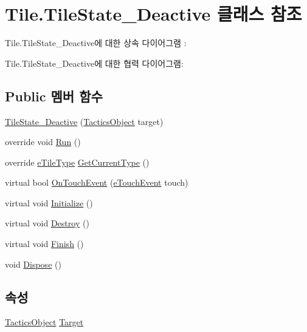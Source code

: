 \hypertarget{class_tile_1_1_tile_state___deactive}{}\section{Tile.\+Tile\+State\+\_\+\+Deactive 클래스 참조}
\label{class_tile_1_1_tile_state___deactive}


Tile.\+Tile\+State\+\_\+\+Deactive에 대한 상속 다이어그램 \+: 


Tile.\+Tile\+State\+\_\+\+Deactive에 대한 협력 다이어그램\+:
\subsection*{Public 멤버 함수}
\begin{DoxyCompactItemize}
\item 
\hyperlink{class_tile_1_1_tile_state___deactive_ac54bf790e9656300ad696f6d5bc3cb2b}{Tile\+State\+\_\+\+Deactive} (\hyperlink{class_tactics_object}{Tactics\+Object} target)
\item 
override void \hyperlink{class_tile_1_1_tile_state___deactive_a806c5dbc5eb43903ad41d448f3d25c61}{Run} ()
\item 
override \hyperlink{_tile_8cs_a271bc07be325bca511bcb747e0ff2fda}{e\+Tile\+Type} \hyperlink{class_tile_1_1_tile_state___deactive_a1aed8e0336e11dcb55cb598119c53eda}{Get\+Current\+Type} ()
\item 
virtual bool \hyperlink{class_tile_1_1_tile_state_a8687f7cb0e2c1a436c5ac395f4f6d07a}{On\+Touch\+Event} (\hyperlink{_touch_manager_8cs_ae33e321a424fe84ba8b2fdb81ad40a68}{e\+Touch\+Event} touch)
\item 
virtual void \hyperlink{class_m_c_n_1_1_state_a5be59bc891e64cbbe4322d74a6746908}{Initialize} ()
\item 
virtual void \hyperlink{class_m_c_n_1_1_state_aebf48ef248bbf185d6aae91d9789459e}{Destroy} ()
\item 
virtual void \hyperlink{class_m_c_n_1_1_state_a2492ca731678b8216c02134dddeeb745}{Finish} ()
\item 
void \hyperlink{class_m_c_n_1_1_state_af6df0477e0dead784489688cb2c2093e}{Dispose} ()
\end{DoxyCompactItemize}
\subsection*{속성}
\begin{DoxyCompactItemize}
\item 
\hyperlink{class_tactics_object}{Tactics\+Object} \hyperlink{class_m_c_n_1_1_state_a79a563b32f183c9adc9a96679fc57eb8}{Target}
\end{DoxyCompactItemize}
